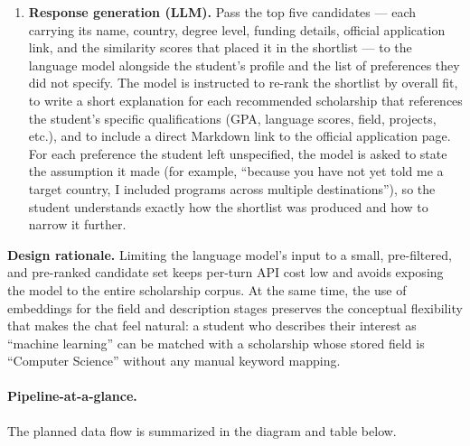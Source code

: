 \begin{enumerate}
    \item \textbf{Response generation (LLM).} Pass the top five candidates --- each carrying its name, country, degree level, funding details, official application link, and the similarity scores that placed it in the shortlist --- to the language model alongside the student's profile and the list of preferences they did not specify. The model is instructed to re-rank the shortlist by overall fit, to write a short explanation for each recommended scholarship that references the student's specific qualifications (GPA, language scores, field, projects, etc.), and to include a direct Markdown link to the official application page. For each preference the student left unspecified, the model is asked to state the assumption it made (for example, ``because you have not yet told me a target country, I included programs across multiple destinations''), so the student understands exactly how the shortlist was produced and how to narrow it further.
\end{enumerate}

\textbf{Design rationale.} Limiting the language model's input to a small, pre-filtered, and pre-ranked candidate set keeps per-turn API cost low and avoids exposing the model to the entire scholarship corpus. At the same time, the use of embeddings for the field and description stages preserves the conceptual flexibility that makes the chat feel natural: a student who describes their interest as ``machine learning'' can be matched with a scholarship whose stored field is ``Computer Science'' without any manual keyword mapping.

\paragraph{Pipeline-at-a-glance.} The planned data flow is summarized in the diagram and table below.

